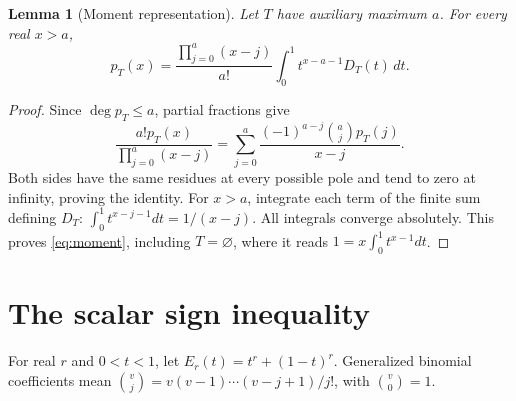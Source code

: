 \documentclass[11pt]{article}
\newtheorem{lemma}[theorem]{Lemma}
\theoremstyle{definition}
\begin{document}
\begin{lemma}[Moment representation]\label{lem:moment}
Let $T$ have auxiliary maximum $a$. For every real $x>a$,
\begin{equation}\label{eq:moment}
 p_T(x)=\frac{\prod_{j=0}^{a}(x-j)}{a!}
              \int_0^1 t^{x-a-1}D_T(t)\,dt.
\end{equation}
\end{lemma}
\begin{proof}
Since $\deg p_T\le a$, partial fractions give
\[
 \frac{a!p_T(x)}{\prod_{j=0}^{a}(x-j)}
 =\sum_{j=0}^a\frac{(-1)^{a-j}\binom aj p_T(j)}{x-j}.
\]
Both sides have the same residues at every possible pole and tend to zero at infinity, proving the identity. For $x>a$, integrate each term of the finite sum defining $D_T$: $\int_0^1t^{x-j-1}dt=1/(x-j)$. All integrals converge absolutely. This proves \eqref{eq:moment}, including $T=\varnothing$, where it reads $1=x\int_0^1t^{x-1}dt$.
\end{proof}

\section{The scalar sign inequality}
For real $r$ and $0<t<1$, let $E_r(t)=t^r+(1-t)^r$. Generalized binomial coefficients mean $\binom vj=v(v-1)\cdots(v-j+1)/j!$, with $\binom v0=1$.
\end{document}
